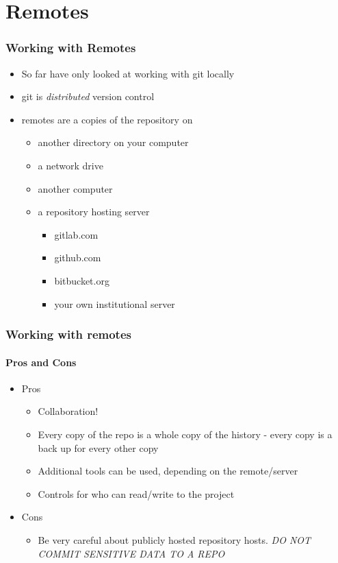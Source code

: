 \section{Remotes}
\begin{frame}
  \frametitle{Working with Remotes}
  \begin{itemize}
    \item So far have only looked at working with git locally
    \item git is \emph{distributed} version control
    \item remotes are a copies of the repository on
      \begin{itemize}
        \item another directory on your computer
        \item a network drive
        \item another computer
        \item a repository hosting server
          \begin{itemize}
            \item gitlab.com
            \item github.com
            \item bitbucket.org
            \item your own institutional server
          \end{itemize}
      \end{itemize}
  \end{itemize}
\end{frame}

\begin{frame}
  \frametitle{Working with remotes}
  \framesubtitle{Pros and Cons}
  \begin{itemize}
    \item Pros
      \begin{itemize}
        \item Collaboration!
        \item Every copy of the repo is a whole copy of the history - every
          copy is a back up for every other copy
        \item Additional tools can be used, depending on the remote/server
        \item Controls for who can read/write to the project
      \end{itemize}
    \item Cons
      \begin{itemize}
        \item Be very careful about publicly hosted repository hosts.  \emph{DO
          NOT COMMIT SENSITIVE DATA TO A REPO}
      \end{itemize}
  \end{itemize}
\end{frame}

